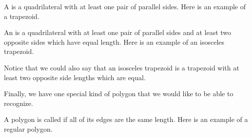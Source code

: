 \documentclass{ximera}
\begin{document}
\begin{definition}
	A  is a quadrilateral with at least one pair of parallel sides. Here is an example of a trapezoid.
	\begin{image}
	\end{image}
\end{definition}


\begin{definition}
	An  is a quadrilateral with at least one pair of parallel sides and at least two opposite sides which have equal length. Here is an example of an isosceles trapezoid.
	\begin{image}
	\end{image}
\end{definition}
Notice that we could also say that an isosceles trapezoid is a trapezoid with at least two opposite side lengths which are equal.





Finally, we have one special kind of polygon that we would like to be able to recognize.
\begin{definition}
	A polygon is called  if all of its edges are the same length. Here is an example of a regular polygon.
	\begin{image}
	\end{image}
\end{definition}
\end{document}
